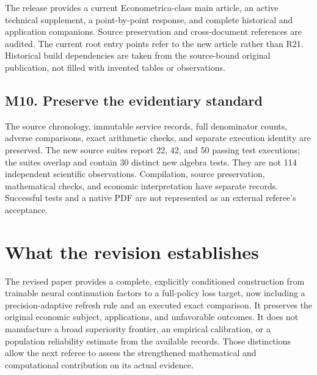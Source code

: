 \documentclass[ecta,nameyear,draft]{econsocart}
\theoremstyle{definition}
\theoremstyle{remark}
\begin{document}
The release provides a current Econometrica-class main article, an active technical supplement, a point-by-point response, and complete historical and application companions. Source preservation and cross-document references are audited. The current root entry points refer to the new article rather than R21. Historical build dependencies are taken from the source-bound original publication, not filled with invented tables or observations.

\subsection*{M10. Preserve the evidentiary standard}

The source chronology, immutable service records, full denominator counts, adverse comparisons, exact arithmetic checks, and separate execution identity are preserved. The new source suites report 22, 42, and 50 passing test executions; the suites overlap and contain 30 distinct new algebra tests. They are not 114 independent scientific observations. Compilation, source preservation, mathematical checks, and economic interpretation have separate records. Successful tests and a native PDF are not represented as an external referee's acceptance.

\section*{What the revision establishes}

The revised paper provides a complete, explicitly conditioned construction from trainable neural continuation factors to a full-policy loss target, now including a precision-adaptive refresh rule and an executed exact comparison. It preserves the original economic subject, applications, and unfavorable outcomes. It does not manufacture a broad superiority frontier, an empirical calibration, or a population reliability estimate from the available records. Those distinctions allow the next referee to assess the strengthened mathematical and computational contribution on its actual evidence.
\end{document}
